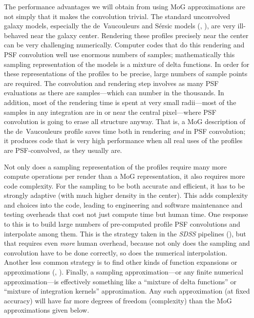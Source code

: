 \documentclass[12pt,pdftex,preprint]{aastex}
\newcommand{\project}[1]{\textsl{#1}}
\begin{document}
The performance advantages we will obtain from using MoG
approximations are not simply that it makes the convolution trivial.
The standard unconvolved galaxy models, especially the de~Vaucouleurs
and S\'ersic models (\citealt{dev}, \citealt{ser}), are very
ill-behaved near the galaxy center.  Rendering these profiles
precisely near the center can be very challenging numerically.
Computer codes that do this rendering and PSF convolution well use
enormous numbers of samples; mathematically this sampling
representation of the models is a mixture of delta functions.  In
order for these representations of the profiles to be precise, large
numbers of sample points are required.  The convolution and rendering
step involves as many PSF evaluations as there are samples---which can
number in the thousands.  In addition, most of the rendering time is
spent at very small radii---most of the samples in any integration are
in or near the central pixel---where PSF convolution is going to erase
all structure anyway.  That is, a MoG description of the
de~Vaucouleurs profile saves time both in rendering \emph{and} in PSF
convolution; it produces code that is very high performance when all
real uses of the profiles are PSF-convolved, as they usually are.

Not only does a sampling representation of the profiles require many
more compute operations per render than a MoG representation, it also
requires more code complexity.  For the sampling to be both accurate
and efficient, it has to be strongly adaptive (with much higher
density in the center).  This adds complexity and choices into the
code, leading to engineering and software maintenance and testing
overheads that cost not just compute time but human time.  One
response to this is to build large numbers of pre-computed profile PSF
convolutions and interpolate among them.  This is the strategy taken
in the \project{SDSS} pipelines (\citealt{lupton}), but that requires
even \emph{more} human overhead, because not only does the sampling
and convolution have to be done correctly, so does the numerical
interpolation.  Another less common strategy is to find other kinds of
function expansions or approximations (\citealt{bendi},
\citealt{spergel}).  Finally, a sampling approximation---or any finite
numerical approximation---is effectively something like a ``mixture of
delta functions'' or ``mixture of integration kernels'' approximation.
Any such approximation (at fixed accuracy) will have far more degrees
of freedom (complexity) than the MoG approximations given below.
\end{document}

